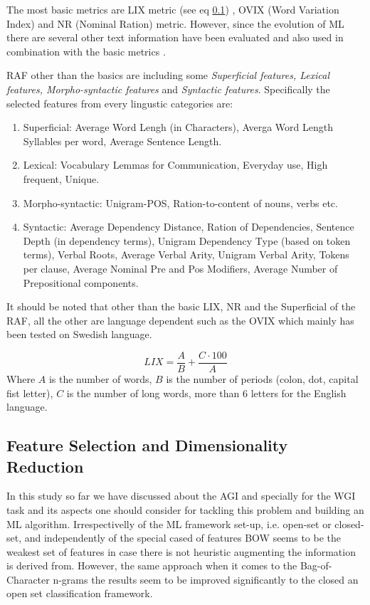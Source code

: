 The most basic metrics are LIX metric (see eq \ref{}) , OVIX (Word Variation Index) and NR (Nominal Ration) metric. However, since the evolution of ML there are several other text information have been evaluated and also used in combination with the basic metrics \parencite{falkenjack2013features}.

RAF other than the basics are including some \textit{Superficial features, Lexical features, Morpho-syntactic features} and \textit{Syntactic features}. Specifically the selected features from every lingustic categories are:

\begin{enumerate}
\item Superficial: Average Word Lengh (in Characters), Averga Word Length Syllables per word, Average Sentence Length.
\item Lexical: Vocabulary Lemmas for Communication, Everyday use, High frequent, Unique.
\item Morpho-syntactic: Unigram-POS, Ration-to-content of nouns, verbs etc.
\item Syntactic: Average Dependency Distance, Ration of Dependencies, Sentence Depth (in dependency terms), Unigram Dependency Type (based on token terms), Verbal Roots, Average Verbal Arity, Unigram Verbal Arity, Tokens per clause, Average Nominal Pre and Pos Modifiers, Average Number of Prepositional components.
\end{enumerate}

It should be noted that other than the basic LIX, NR and the Superficial of the RAF, all the other are language dependent such as the OVIX which mainly has been tested on Swedish language.

\begin{equation} \label{chap:relevant_work:eq:LIX}
	LIX = \frac{A}{B} + \frac{C \cdot 100}{A}
\end{equation}
Where $A$ is the number of words, $B$ is the number of periods (colon, dot, capital fist letter), $C$ is the number of long words, more than 6 letters for the English language. 

\subsection{Feature Selection and Dimensionality Reduction}

In this study so far we have discussed about the AGI and specially for the WGI task and its aspects one should consider for tackling this problem and building an ML algorithm. Irrespectivelly of the ML framework set-up, i.e. open-set or closed-set, and independently of the special cased of features BOW seems to be the weakest set of features in case there is not heuristic augmenting the information is derived from. However, the same approach when it comes to the Bag-of-Character n-grams the results seem to be improved significantly to the closed an open set classification framework. 

